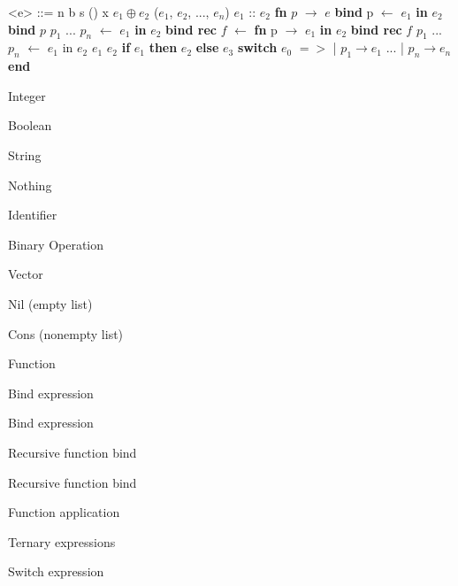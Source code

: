 \documentclass[titlepage]{article}
\begin{document}
\begin{minipage}[t]{0.6\textwidth}

  \begin{grammar}


    <e> ::= n 
    \alt b 
    \alt s 
    \alt () 
    \alt x
    \alt $e_1 \oplus e_2$
    \alt ($e_1$, $e_2$, ..., $e_n$)
    \alt [\space]
    \alt $e_1$ :: $e_2$
    \alt \textbf{fn} $p$ $\rightarrow$ $e$
    \alt \textbf{bind} p $\leftarrow$ $e_1$ \textbf{in} $e_2$
    \alt \textbf{bind} $p$ \space $p_1$ ... $p_n$ $\leftarrow$ $e_1$ \textbf{in} $e_2$
    \alt \textbf{bind rec} $f$ $\leftarrow$ \textbf{fn} p $\rightarrow$ $e_1$ \textbf{in} $e_2$
    \alt \textbf{bind rec} $f$ \space $p_1$ ... $p_n$ $\leftarrow$ $e_1$ in $e_2$
    \alt $e_1$ \space $e_2$
    \alt \textbf{if} $e_1$ \textbf{then} $e_2$ \textbf{else} $e_3$
    \alt \textbf{switch} $e_0$ $=>$ | $p_1 \rightarrow e_1$ ... | $p_n \rightarrow e_n$ \textbf{end}
    
    
    \end{grammar}
\end{minipage}
\hfill
\begin{minipage}[t]{0.3\textwidth}

  Integer

  Boolean

  String

  Nothing

  Identifier

  Binary Operation

  Vector

  Nil (empty list)

  Cons (nonempty list)

  Function

  Bind expression

  Bind expression

  Recursive function bind

  Recursive function bind

  Function application

  Ternary expressions

  Switch expression
\end{minipage}
\end{document}
